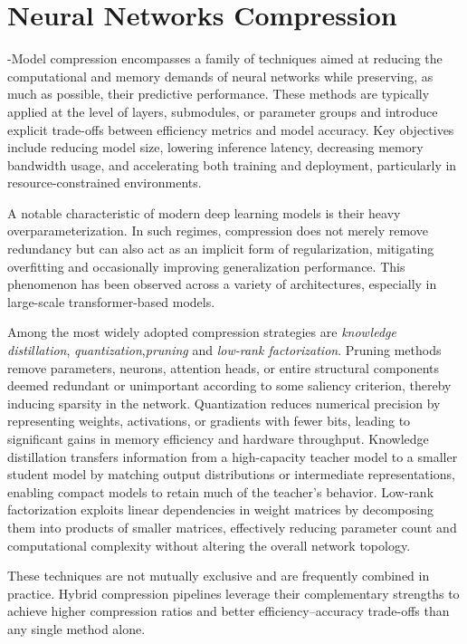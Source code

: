 \chapter{Neural Networks Compression}
-Model compression encompasses a family of techniques aimed at reducing the computational and memory demands of neural networks while preserving, as much as possible, their predictive performance. These methods are typically applied at the level of layers, submodules, or parameter groups and introduce explicit trade-offs between efficiency metrics and model accuracy. Key objectives include reducing model size, lowering inference latency, decreasing memory bandwidth usage, and accelerating both training and deployment, particularly in resource-constrained environments.

A notable characteristic of modern deep learning models is their heavy overparameterization. In such regimes, compression does not merely remove redundancy but can also act as an implicit form of regularization, mitigating overfitting and occasionally improving generalization performance. This phenomenon has been observed across a variety of architectures, especially in large-scale transformer-based models.

Among the most widely adopted compression strategies are \emph{knowledge distillation}, \emph{quantization},\emph{pruning} and \emph{low-rank factorization}. Pruning methods remove parameters, neurons, attention heads, or entire structural components deemed redundant or unimportant according to some saliency criterion, thereby inducing sparsity in the network. Quantization reduces numerical precision by representing weights, activations, or gradients with fewer bits, leading to significant gains in memory efficiency and hardware throughput. Knowledge distillation transfers information from a high-capacity teacher model to a smaller student model by matching output distributions or intermediate representations, enabling compact models to retain much of the teacher’s behavior. Low-rank factorization exploits linear dependencies in weight matrices by decomposing them into products of smaller matrices, effectively reducing parameter count and computational complexity without altering the overall network topology.

These techniques are not mutually exclusive and are frequently combined in practice. Hybrid compression pipelines leverage their complementary strengths to achieve higher compression ratios and better efficiency–accuracy trade-offs than any single method alone.

